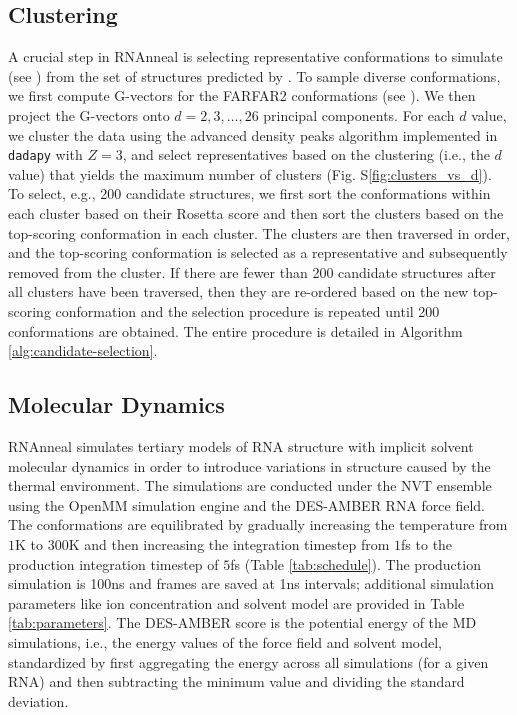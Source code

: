 \documentclass[%
aip,
 amsmath,amssymb,
reprint,%
onecolumn,
]{revtex4-1}
\makeatletter
\newcommand\setcurrentname[1]{\def\@currentlabelname{#1}}
\makeatother
\begin{document}
{\subsection*{Clustering}
\setcurrentname{Clustering}
\label{methods:representatives}

A crucial step in RNAnneal is selecting representative conformations to simulate (see ) from the set of structures predicted by . To sample diverse conformations, we first compute G-vectors for the FARFAR2 conformations (see ). We then project the G-vectors onto $d=2,3,\ldots,26$ principal components. For each $d$ value, we cluster the data using the advanced density peaks algorithm\cite{d2021automatic} implemented in \texttt{dadapy}\cite{glielmo2022dadapy} with $Z=3$, and select representatives based on the clustering (i.e., the $d$ value) that yields the maximum number of clusters (Fig. S\ref{fig:clusters_vs_d}). To select, e.g., 200 candidate structures, we first sort the conformations within each cluster based on their Rosetta score and then sort the clusters based on the top-scoring conformation in each cluster. The clusters are then traversed in order, and the top-scoring conformation is selected as a representative and subsequently removed from the cluster. If there are fewer than 200 candidate structures after all clusters have been traversed, then they are re-ordered based on the new top-scoring conformation and the selection procedure is repeated until 200 conformations are obtained. The entire procedure is detailed in Algorithm \ref{alg:candidate-selection}.

\subsection*{Molecular Dynamics}
\setcurrentname{Molecular Dynamics}
\label{methods:molecular-dynamics}

RNAnneal simulates tertiary models of RNA structure with implicit solvent molecular dynamics in order to introduce variations in structure caused by the thermal environment. The simulations are conducted under the NVT ensemble using the OpenMM simulation engine and the DES-AMBER RNA force field.\cite{eastman2023openmm,tan2018rna} The conformations are equilibrated by gradually increasing the temperature from $1$K to $300$K and then increasing the integration timestep from $1$fs to the production integration timestep of $5$fs (Table \ref{tab:schedule}). The production simulation is 100ns and frames are saved at 1ns intervals; additional simulation parameters like ion concentration and solvent model are provided in Table \ref{tab:parameters}. The DES-AMBER score is the potential energy of the MD simulations, i.e., the energy values of the force field and solvent model, standardized by first aggregating the energy across all simulations (for a given RNA) and then subtracting the minimum value and dividing the standard deviation.

}
\end{document}
